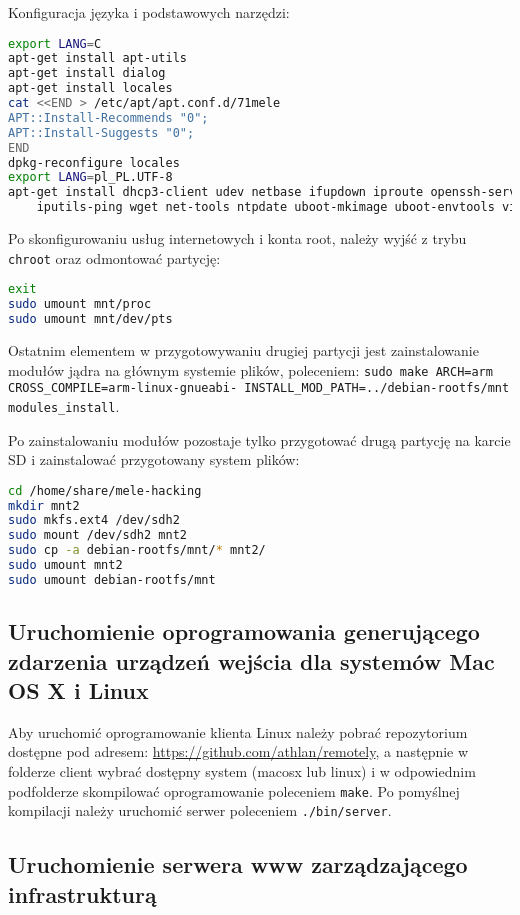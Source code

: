 Konfiguracja języka i podstawowych narzędzi:
\begin{lstlisting}[language=bash]
export LANG=C
apt-get install apt-utils
apt-get install dialog
apt-get install locales
cat <<END > /etc/apt/apt.conf.d/71mele
APT::Install-Recommends "0";
APT::Install-Suggests "0";
END
dpkg-reconfigure locales
export LANG=pl_PL.UTF-8
apt-get install dhcp3-client udev netbase ifupdown iproute openssh-server \
    iputils-ping wget net-tools ntpdate uboot-mkimage uboot-envtools vim nano less X
\end{lstlisting}

Po skonfigurowaniu usług internetowych i konta root, należy wyjść z trybu \lstinline{chroot} oraz odmontować partycję:

\begin{lstlisting}[language=bash]
exit
sudo umount mnt/proc
sudo umount mnt/dev/pts
\end{lstlisting}

Ostatnim elementem w przygotowywaniu drugiej partycji jest zainstalowanie modułów jądra na głównym systemie plików, poleceniem: \lstinline{sudo make ARCH=arm CROSS_COMPILE=arm-linux-gnueabi- INSTALL_MOD_PATH=../debian-rootfs/mnt modules_install}.

Po zainstalowaniu modułów pozostaje tylko przygotować drugą partycję na karcie SD i zainstalować przygotowany system plików:
\begin{lstlisting}[language=bash]
cd /home/share/mele-hacking
mkdir mnt2
sudo mkfs.ext4 /dev/sdh2 
sudo mount /dev/sdh2 mnt2
sudo cp -a debian-rootfs/mnt/* mnt2/
sudo umount mnt2
sudo umount debian-rootfs/mnt
\end{lstlisting}

\subsection{Uruchomienie oprogramowania generującego zdarzenia urządzeń wejścia dla systemów Mac OS X i Linux}


Aby uruchomić oprogramowanie klienta Linux należy pobrać repozytorium dostępne pod adresem: \url{https://github.com/athlan/remotely}, a następnie w folderze client wybrać dostępny system (macosx lub linux) i w odpowiednim podfolderze skompilować oprogramowanie poleceniem \lstinline{make}.
Po pomyślnej kompilacji należy uruchomić serwer poleceniem \lstinline{./bin/server}.


\subsection{Uruchomienie serwera www zarządzającego infrastrukturą}

